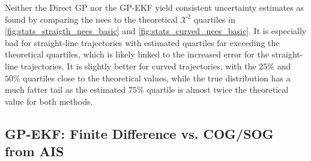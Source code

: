 Neither the Direct GP nor the GP-EKF yield consistent uncertainty estimates as found by comparing the \acrshort{nees} to the theoretical $\mathcal{X}^2$ quartiles in \cref{fig:stats_straigth_nees_basic} and \cref{fig:stats_curved_nees_basic}. It is especially bad for straight-line trajectories with estimated quartiles far exceeding the theoretical quartiles, which is likely linked to the increased error for the straight-line trajectories. It is slightly better for curved trajectories, with the $25\%$ and $50\%$ quartiles close to the theoretical values, while the true distribution has a much fatter tail as the estimated $75\%$ quartile is almost twice the theoretical value for both methods.

\subsection{GP-EKF: Finite Difference vs. COG/SOG from AIS}

